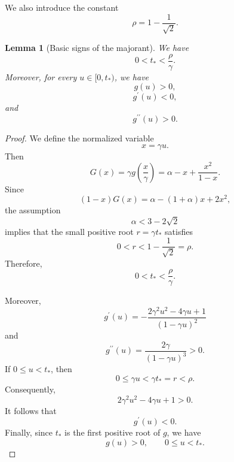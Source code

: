 \documentclass[11pt,a4paper]{article}
\numberwithin{equation}{section}
\numberwithin{table}{section}
\theoremstyle{plain}
\newtheorem{lemma}[theorem]{Lemma}
\theoremstyle{definition}\newtheorem{definition}[theorem]{Definition}
\theoremstyle{remark}\newtheorem{remark}[theorem]{Remark}
\begin{document}
We also introduce the constant 
\begin{equation*}
\rho=1-\frac1{\sqrt2}.
\end{equation*}

\begin{lemma}[Basic signs of the majorant]\label{supp:s2lemma1}
We have 
\begin{equation*}
0<t_*<\frac{\rho}{\gamma}.
\end{equation*}
Moreover, for every $u\in[0,t_*)$, we have 
\begin{equation*}
g(u)>0,
\end{equation*}
\begin{equation*}
g^{\prime}(u)<0,
\end{equation*}
and 
\begin{equation*}
g^{\prime\prime}(u)>0.
\end{equation*}
\end{lemma}

\begin{proof}
We define the normalized variable 
\begin{equation*}
x=\gamma u.
\end{equation*}
Then 
\begin{equation*}
G(x)=\gamma g\left(\frac{x}{\gamma}\right) =\alpha-x+\frac{x^2}{1-x}.
\end{equation*}
Since 
\begin{equation*}
(1-x)G(x)=\alpha-(1+\alpha)x+2x^2,
\end{equation*}
the assumption 
\begin{equation*}
\alpha<3-2\sqrt2
\end{equation*}
implies that the small positive root $r=\gamma t_*$ satisfies 
\begin{equation*}
0<r<1-\frac1{\sqrt2}=\rho.
\end{equation*}
Therefore, 
\begin{equation*}
0<t_*<\frac{\rho}{\gamma}.
\end{equation*}

Moreover, 
\begin{equation*}
g^{\prime}(u)=-\frac{2\gamma^2u^2-4\gamma u+1}{(1-\gamma u)^2}
\end{equation*}
and 
\begin{equation*}
g^{\prime\prime}(u)=\frac{2\gamma}{(1-\gamma u)^3}>0.
\end{equation*}
If $0\leq u<t_*$, then 
\begin{equation*}
0\leq \gamma u<\gamma t_*=r<\rho.
\end{equation*}
Consequently, 
\begin{equation*}
2\gamma^2u^2-4\gamma u+1>0.
\end{equation*}
It follows that 
\begin{equation*}
g^{\prime}(u)<0.
\end{equation*}
Finally, since $t_*$ is the first positive root of $g$, we have 
\begin{equation*}
g(u)>0, \qquad 0\leq u<t_*.
\end{equation*}
\end{proof}
\end{document}
